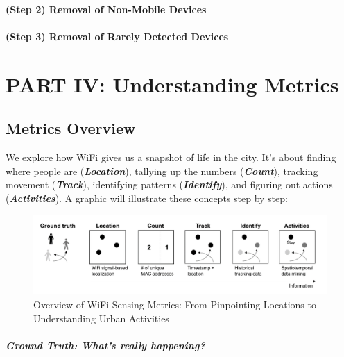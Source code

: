 \documentclass[
  letterpaper,
]{scrbook}
\begin{document}
\hypertarget{step-2-removal-of-non-mobile-devices}{%
\subsection{(Step 2) Removal of Non-Mobile
Devices}\label{step-2-removal-of-non-mobile-devices}}

\hypertarget{step-3-removal-of-rarely-detected-devices}{%
\subsection{(Step 3) Removal of Rarely Detected
Devices}\label{step-3-removal-of-rarely-detected-devices}}

\part{PART IV: Understanding Metrics}

\hypertarget{metrics-overview}{%
\chapter{Metrics Overview}\label{metrics-overview}}

We explore how WiFi gives us a snapshot of life in the city. It's about
finding where people are (\emph{\textbf{Location}}), tallying up the
numbers (\emph{\textbf{Count}}), tracking movement
(\emph{\textbf{Track}}), identifying patterns
(\emph{\textbf{Identify}}), and figuring out actions
(\emph{\textbf{Activities}}). A graphic will illustrate these concepts
step by step:

\begin{figure}

{\centering \includegraphics{content/material/ch4/metric-overview.png}

}

\caption{Overview of WiFi Sensing Metrics: From Pinpointing Locations to
Understanding Urban Activities}

\end{figure}

\hypertarget{ground-truth-whats-really-happening}{%
\subsubsection*{\texorpdfstring{\textbf{Ground Truth: What's really
happening?}}{Ground Truth: What's really happening?}}\label{ground-truth-whats-really-happening}}
\end{document}
